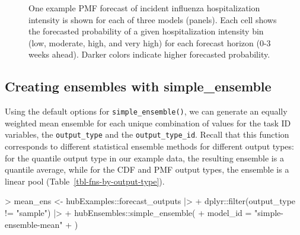\documentclass[
  letterpaper,
  DIV=11,
  numbers=noendperiod]{scrartcl}
\newenvironment{Shaded}{\begin{snugshade}}{\end{snugshade}}
\newcommand{\AttributeTok}[1]{\textcolor[rgb]{0.40,0.45,0.13}{#1}}
\newcommand{\FunctionTok}[1]{\textcolor[rgb]{0.28,0.35,0.67}{#1}}
\newcommand{\NormalTok}[1]{\textcolor[rgb]{0.00,0.23,0.31}{#1}}
\newcommand{\OtherTok}[1]{\textcolor[rgb]{0.00,0.23,0.31}{#1}}
\newcommand{\SpecialCharTok}[1]{\textcolor[rgb]{0.37,0.37,0.37}{#1}}
\newcommand{\StringTok}[1]{\textcolor[rgb]{0.13,0.47,0.30}{#1}}
\begin{document}
\begin{figure}


\caption{\label{fig-plot-ex-mods-pmf}One example PMF forecast of
incident influenza hospitalization intensity is shown for each of three
models (panels). Each cell shows the forecasted probability of a given
hospitalization intensity bin (low, moderate, high, and very high) for
each forecast horizon (0-3 weeks ahead). Darker colors indicate higher
forecasted probability.}

\end{figure}%

\subsection{Creating ensembles with
simple\_ensemble}\label{creating-ensembles-with-simple_ensemble}

Using the default options for \texttt{simple\_ensemble()}, we can
generate an equally weighted mean ensemble for each unique combination
of values for the task ID variables, the \texttt{output\_type} and the
\texttt{output\_type\_id}. Recall that this function corresponds to
different statistical ensemble methods for different output types: for
the quantile output type in our example data, the resulting ensemble is
a quantile average, while for the CDF and PMF output types, the ensemble
is a linear pool (Table~\ref{tbl-fns-by-output-type}).

\begin{Shaded}
\begin{Highlighting}[]
\SpecialCharTok{\textgreater{}}\NormalTok{ mean\_ens }\OtherTok{\textless{}{-}}\NormalTok{ hubExamples}\SpecialCharTok{::}\NormalTok{forecast\_outputs }\SpecialCharTok{|\textgreater{}}
\SpecialCharTok{+}\NormalTok{   dplyr}\SpecialCharTok{::}\FunctionTok{filter}\NormalTok{(output\_type }\SpecialCharTok{!=} \StringTok{"sample"}\NormalTok{) }\SpecialCharTok{|\textgreater{}}
\SpecialCharTok{+}\NormalTok{   hubEnsembles}\SpecialCharTok{::}\FunctionTok{simple\_ensemble}\NormalTok{(}
\SpecialCharTok{+}     \AttributeTok{model\_id =} \StringTok{"simple{-}ensemble{-}mean"}
\SpecialCharTok{+}\NormalTok{   )}
\end{Highlighting}
\end{Shaded}
\end{document}
